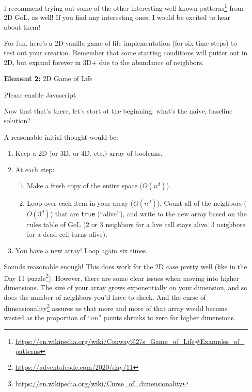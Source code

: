 \documentclass[]{article}
\renewcommand{\href}[2]{#2\footnote{\url{#1}}}
\begin{document}
I recommend trying out some of the
\href{https://en.wikipedia.org/wiki/Conway\%27s_Game_of_Life\#Examples_of_patterns}{other
interesting well-known patterns} from 2D GoL, as well! If you find any
interesting ones, I would be excited to hear about them!

For fun, here's a 2D vanilla game of life implementation (for six time steps) to
test out your creation. Remember that some starting conditions will putter out
in 2D, but expand forever in 3D+ due to the abundance of neighbors.

\leavevmode\hypertarget{gol2D}{}%
\textbf{Element 2:} 2D Game of Life

\leavevmode\hypertarget{gol2DCont}{}%
Please enable Javascript

Now that that's there, let's start at the beginning: what's the naive, baseline
solution?

A reasonable initial thought would be:

\begin{enumerate}
\def\labelenumi{\arabic{enumi}.}
\tightlist
\item
  Keep a 2D (or 3D, or 4D, etc.) array of booleans.
\item
  At each step:

  \begin{enumerate}
  \def\labelenumii{\alph{enumii}.}
  \tightlist
  \item
    Make a fresh copy of the entire space (\(O(n^d)\)).
  \item
    Loop over each item in your array (\(O(n^d)\)). Count all of the neighbors
    (\(O(3^d)\)) that are \texttt{true} (``alive''), and write to the new array
    based on the rules table of GoL (2 or 3 neighbors for a live cell stays
    alive, 3 neighbors for a dead cell turns alive).
  \end{enumerate}
\item
  You have a new array! Loop again six times.
\end{enumerate}

Sounds reasonable enough! This does work for the 2D case pretty well (like in
the \href{https://adventofcode.com/2020/day/11}{Day 11 puzzle}). However, there
are some clear issues when moving into higher dimensions. The size of your array
grows exponentially on your dimension, and so does the number of neighbors you'd
have to check. And the
\href{https://en.wikipedia.org/wiki/Curse_of_dimensionality}{curse of
dimensionality} assures us that more and more of that array would become wasted
as the proportion of ``on'' points shrinks to zero for higher dimensions.
\end{document}
